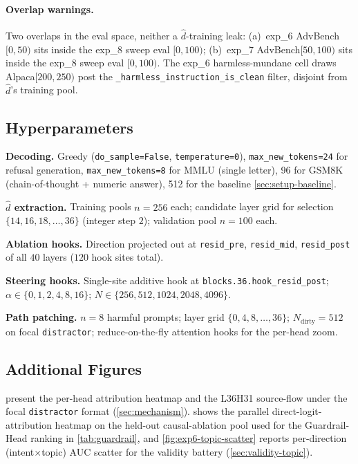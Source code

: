 \documentclass[10pt,twocolumn]{article}
\newcommand{\dhat}{\hat{d}}
\newcommand{\Ncontext}{N}
\newcommand{\advbench}{AdvBench}
\newcommand{\alpaca}{Alpaca}
\theoremstyle{definition}
\begin{document}
\paragraph{Overlap warnings.} Two overlaps in the eval space, neither
a $\dhat$-training leak: (a)~exp\_6 \advbench{}$[0, 50)$ sits inside
the exp\_8 sweep eval $[0, 100)$; (b)~exp\_7 \advbench{}$[50, 100)$
sits inside the exp\_8 sweep eval $[0, 100)$. The exp\_6
harmless-mundane cell draws \alpaca{}$[200, 250)$ post the
\texttt{\_harmless\_instruction\_is\_clean} filter, disjoint from
$\dhat$'s training pool.

\subsection{Hyperparameters}
\label{app:hparams}

\textbf{Decoding.} Greedy (\texttt{do\_sample=False},
\texttt{temperature=0}), \texttt{max\_new\_tokens=24} for refusal
generation, \texttt{max\_new\_tokens=8} for MMLU (single letter), 96
for GSM8K (chain-of-thought + numeric answer), 512 for the baseline
\cref{sec:setup-baseline}.

\textbf{$\dhat$ extraction.} Training pools $n{=}256$ each;
candidate layer grid for selection $\{14, 16, 18, \ldots, 36\}$
(integer step $2$); validation pool $n{=}100$ each.

\textbf{Ablation hooks.} Direction projected out at
\texttt{resid\_pre}, \texttt{resid\_mid}, \texttt{resid\_post} of
all $40$ layers ($120$ hook sites total).

\textbf{Steering hooks.} Single-site additive hook at
\texttt{blocks.36.hook\_resid\_post};
$\alpha \in \{0, 1, 2, 4, 8, 16\}$;
$\Ncontext \in \{256, 512, 1024, 2048, 4096\}$.

\textbf{Path patching.} $n{=}8$ harmful prompts; layer grid
$\{0, 4, 8, \ldots, 36\}$; $\Ncontext_{\mathrm{dirty}}{=}512$
on focal \texttt{distractor}; reduce-on-the-fly attention hooks for
the per-head zoom.

\FloatBarrier

\subsection{Additional Figures}
\label{app:figures}

 present the
per-head attribution heatmap and the L36H31 source-flow under the
focal \texttt{distractor} format
(\cref{sec:mechanism}).
 shows the parallel direct-logit-attribution
heatmap on the held-out causal-ablation pool used for the
Guardrail-Head ranking in \cref{tab:guardrail}, and
\cref{fig:exp6-topic-scatter} reports per-direction
(intent$\times$topic) AUC scatter for the validity battery
(\cref{sec:validity-topic}).
\end{document}
